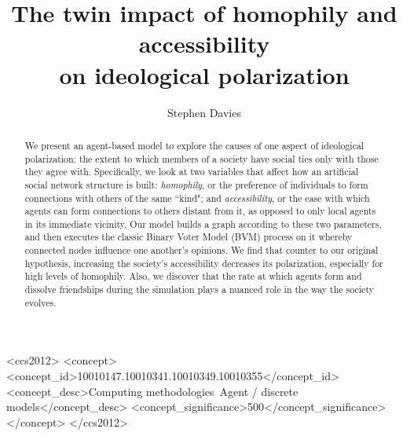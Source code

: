 \documentclass[sigconf]{acmart}
\begin{document}
\title{The twin impact of homophily and accessibility\\on ideological
polarization}


\author{Stephen Davies}

\renewcommand{\shortauthors}{S. Davies}


\begin{abstract}
We present an agent-based model to explore the causes of one aspect of
ideological polarization: the extent to which members of a society have social
ties only with those they agree with. Specifically, we look at two variables
that affect how an artificial social network structure is built:
\textit{homophily}, or the preference of individuals to form connections with
others of the same ``kind"; and \textit{accessibility}, or the ease with which
agents can form connections to others distant from it, as opposed to only
local agents in its immediate vicinity. Our model builds a graph according to
these two parameters, and then executes the classic Binary Voter Model (BVM)
process on it whereby connected nodes influence one another's opinions. We
find that counter to our original hypothesis, increasing the society's
accessibility decreases its polarization, especially for high levels of
homophily. Also, we discover that the rate at which agents form and dissolve
friendships during the simulation plays a nuanced role in the way the society
evolves.
\end{abstract}

%
%
\begin{CCSXML}
<ccs2012>
<concept>
<concept_id>10010147.10010341.10010349.10010355</concept_id>
<concept_desc>Computing methodologies~Agent / discrete models</concept_desc>
<concept_significance>500</concept_significance>
</concept>
</ccs2012>
\end{CCSXML}





\maketitle



\appendix



\end{document}
